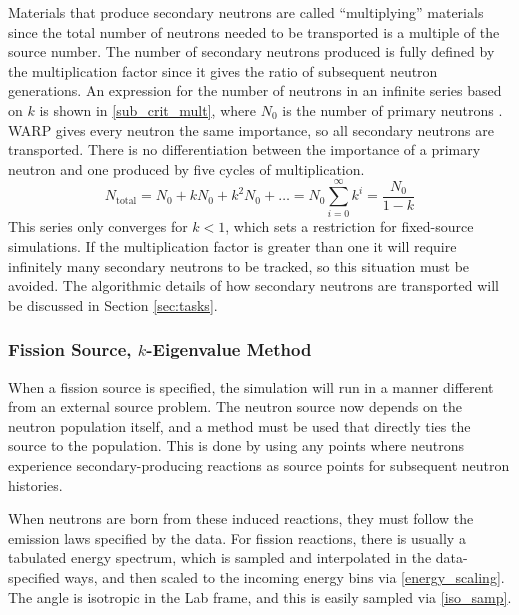 Materials that produce secondary neutrons are called ``multiplying'' materials since the total number of neutrons needed to be transported is a multiple of the source number.  The number of secondary neutrons produced is fully defined by the multiplication factor since it gives the ratio of subsequent neutron generations.  An expression for the number of neutrons in an infinite series based on $k$ is shown in \eqref{sub_crit_mult}, where $N_0$ is the number of primary neutrons \cite{duderstadt}\cite{jaakko}.  WARP gives every neutron the same importance, so all secondary neutrons are transported.  There is no differentiation between the importance of a primary neutron and one produced by five cycles of multiplication.  
%
\begin{equation}
\label{sub_crit_mult}
N_\mathrm{total} = N_0 + k N_0 + k^2 N_0 + \dots = N_0 \sum_{i=0}^\infty k^i = \frac{N_0}{1-k}
\end{equation}
%
This series only converges for $k<1$, which sets a restriction for fixed-source simulations.  If the multiplication factor is greater than one it will require infinitely many secondary neutrons to be tracked, so this situation must be avoided.  The algorithmic details of how secondary neutrons are transported will be discussed in Section \ref{sec:tasks}.

\subsubsection{Fission Source, $k$-Eigenvalue Method}

When a fission source is specified, the simulation will run in a manner different from an external source problem.  The neutron source now depends on the neutron population itself, and a method must be used that directly ties the source to the population.  This is done by using any points where neutrons experience secondary-producing reactions as source points for subsequent neutron histories.  

When neutrons are born from these induced reactions, they must follow the emission laws specified by the data.  For fission reactions, there is usually a tabulated energy spectrum, which is sampled and interpolated in the data-specified ways, and then scaled to the incoming energy bins via \eqref{energy_scaling}.  The angle is isotropic in the Lab frame, and this is easily sampled via \eqref{iso_samp}.

